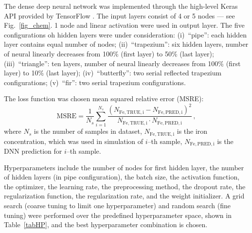\documentclass[a4paper,fleqn]{cas-sc}
\begin{document}
The dense deep neural network was implemented through the high-level Keras API provided by TensorFlow \cite{Keras}.
The input layers consist of 4 or 5 nodes --- see Fig.~\ref{fig_chem}.
1 node and linear activation were used in output layer.
The five configurations oh hidden layers were under consideration:
(i)~``pipe'': each hidden layer contains equal number of nodes;
(ii)~``trapezium'': six hidden layers, number of neural linearly decreases from 100\% (first layer) to 50\% (last layer);
(iii)~``triangle'': ten layers, number of neural linearly decreases from 100\% (first layer) to 10\% (last layer);
(iv)~``butterfly'': two serial reflected trapezium configurations;
(v)~``fir'': two serial trapezium configurations.

The loss function was chosen mean squared relative error (MSRE):
\begin{equation}
\label{eqMSRE}
    \mathrm{MSRE}=\frac{1}{N_s}\sum_{i=1}^{N_s}\frac{(N_\mathrm{Fe,TRUE,i}-N_\mathrm{Fe,PRED,i})^2}{N_\mathrm{Fe,TRUE,i}\cdot N_\mathrm{Fe,PRED,i}}\,,
\end{equation}
where
$N_s$ is the number of samples in dataset,
$N_\mathrm{Fe,TRUE,i}$ is the iron concentration, which was used in simulation of $i$--th sample,
$N_\mathrm{Fe,PRED,i}$ is the DNN prediction for $i$--th sample.

Hyperparameters include the number of nodes for first hidden layer,
the number of hidden layers (in pipe configuration),
the batch size,
the activation function,
the optimizer,
the learning rate,
the preprocessing method,
the dropout rate,
the regularization function,
the regularization rate,
and the weight initializer.
A grid search (coarse tuning to limit one hyperparameter) and random search (fine tuning) were performed over the predefined hyperparameter space, shown in Table~\ref{tabHP}, and the best hyperparameter combination is chosen.
\end{document}
